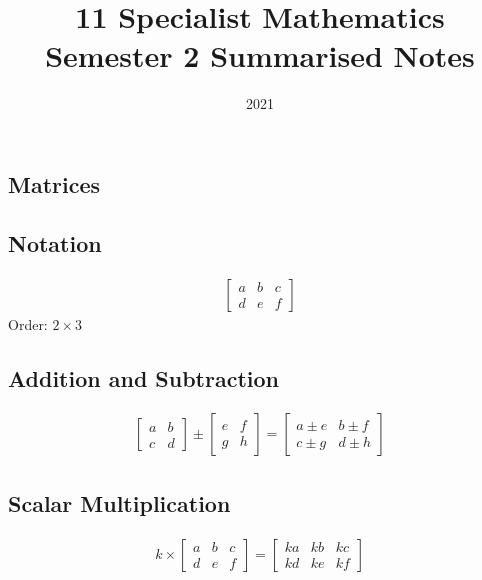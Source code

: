 \documentclass[10pt, a4paper, titlepage]{article}
\begin{document}
\title{11 Specialist Mathematics Semester 2 Summarised Notes}
\author{}
\date{2021}
\maketitle

\begin{multicols*}{3}
\section{Matrices}
\subsection{Notation}
\begin{align}
	\begin{bmatrix}
		a & b & c\\
		d & e & f
	\end{bmatrix}
\end{align}
Order: $2\times 3$

\dotfill
\subsection{Addition and Subtraction}
\begin{align}
	\begin{bmatrix}
		a & b\\
		c & d
	\end{bmatrix}
	\pm
	\begin{bmatrix}
		e & f\\
		g & h
	\end{bmatrix}
	=
	\begin{bmatrix}
		a\pm e & b\pm f\\
		c\pm g & d\pm h
	\end{bmatrix}
\end{align}
\dotfill
\subsection{Scalar Multiplication}
\begin{align}
	k\times
	\begin{bmatrix}
		a & b & c\\
		d & e & f
	\end{bmatrix}
	=
	\begin{bmatrix}
		ka & kb & kc\\
		kd & ke & kf
	\end{bmatrix}
\end{align}
\dotfill

\end{multicols*}
\end{document}
